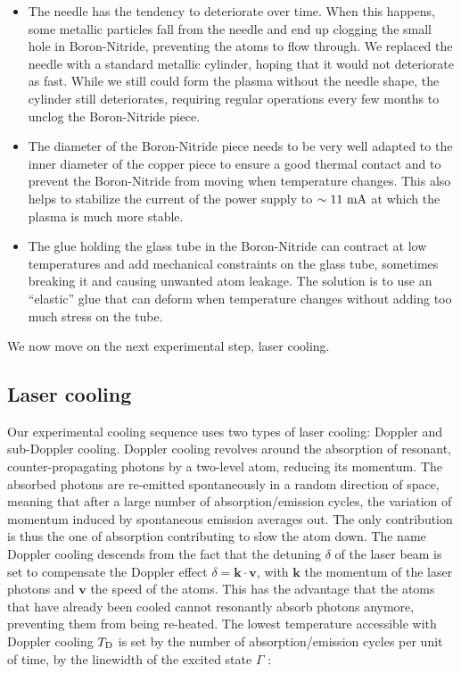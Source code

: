 \begin{itemize}
    \item The needle has the tendency to deteriorate over time. When this happens, some metallic particles fall from the needle and end up clogging the small hole in Boron-Nitride, preventing the atoms to flow through. We replaced the needle with a standard metallic cylinder, hoping that it would not deteriorate as fast. While we still could form the plasma without the needle shape, the cylinder still deteriorates, requiring regular operations every few months to unclog the Boron-Nitride piece.
    \item The diameter of the Boron-Nitride piece needs to be very well adapted to the inner diameter of the copper piece to ensure a good thermal contact and to prevent the Boron-Nitride from moving when temperature changes. This also helps to stabilize the current of the power supply to $\sim 11 \ \rm{mA}$ at which the plasma is much more stable.
    \item The glue holding the glass tube in the Boron-Nitride can contract at low temperatures and add mechanical constraints on the glass tube, sometimes breaking it and causing unwanted atom leakage. The solution is to use an ``elastic'' glue that can deform when temperature changes without adding too much stress on the tube. 
\end{itemize}

We now move on the next experimental step, laser cooling.


\subsection{Laser cooling}

Our experimental cooling sequence uses two types of laser cooling: Doppler and sub-Doppler cooling. Doppler cooling revolves around the absorption of resonant, counter-propagating photons by a two-level atom, reducing its momentum. The absorbed photons are re-emitted spontaneously in a random direction of space, meaning that after a large number of absorption/emission cycles, the variation of momentum induced by spontaneous emission averages out. The only contribution is thus the one of absorption contributing to slow the atom down. The name Doppler cooling descends from the fact that the detuning $\delta$ of the laser beam is set to compensate the Doppler effect $\delta = \bm{k} \cdot \bm{v}$, with $\bm{k}$ the momentum of the laser photons and $\bm{v}$ the speed of the atoms. This has the advantage that the atoms that have already been cooled cannot resonantly absorb photons anymore, preventing them from being re-heated. The lowest temperature accessible with Doppler cooling $T_{\rm{D}}$ is set by the number of absorption/emission cycles per unit of time, \ie by the linewidth of the excited state $\Gamma$ \cite{chang2014three}:

